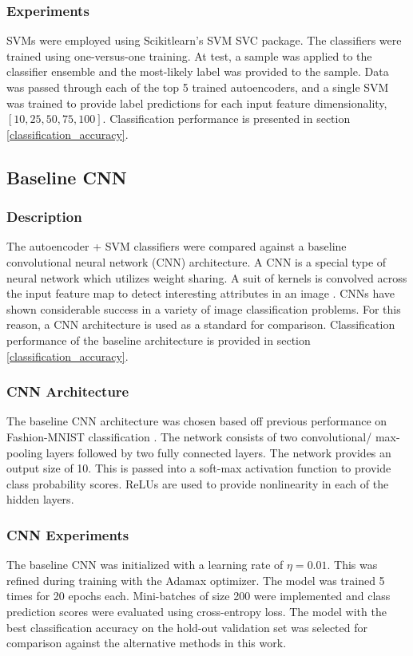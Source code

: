 \documentclass[conference]{IEEEtran}
\begin{document}
	 \subsubsection*{Experiments}
	 SVMs were employed using Scikitlearn's SVM SVC package.  The classifiers were trained using one-versus-one training.  At test, a sample was applied to the classifier ensemble and the most-likely label was provided to the sample.  Data was passed through each of the top 5 trained autoencoders, and a single SVM was trained to provide label predictions for each input feature dimensionality, $[10,25,50,75,100]$.  Classification performance is presented in section \ref{classification_accuracy}. 
	 
	 
	 \subsection{Baseline CNN}
	 
	 \subsubsection*{Description}
	 The autoencoder + SVM classifiers were compared against a baseline convolutional neural network (CNN) architecture.  A CNN is a special type of neural network which utilizes weight sharing. A suit of kernels is convolved across the input feature map to detect interesting attributes in an image \cite{Goodfellow2016DeepLearning,Haykin2009NeuralNetworks}.  CNNs have shown considerable success in a variety of image classification problems.  For this reason, a CNN architecture is used as a standard for comparison.  Classification performance of the baseline architecture is provided in section \ref{classification_accuracy}.
	 
	 \subsubsection*{CNN Architecture}
	 The baseline CNN architecture was chosen based off previous performance on Fashion-MNIST classification \cite{Xiao2017FashionMNIST}.  The network consists of two convolutional/ max-pooling layers followed by two fully connected layers.  The network provides an output size of 10.  This is passed into a soft-max activation function to provide class probability scores.  ReLUs are used to provide nonlinearity in each of the hidden layers. 
	 
	 \subsubsection*{CNN Experiments}
	 The baseline CNN was initialized with a learning rate of $\eta=0.01$.  This was refined during training with the Adamax optimizer.  The model was trained 5 times for 20 epochs each.  Mini-batches of size 200 were implemented and class prediction scores were evaluated using cross-entropy loss.  The model with the best classification accuracy on the hold-out validation set was selected for comparison against the alternative methods in this work.  
	 
\end{document}
